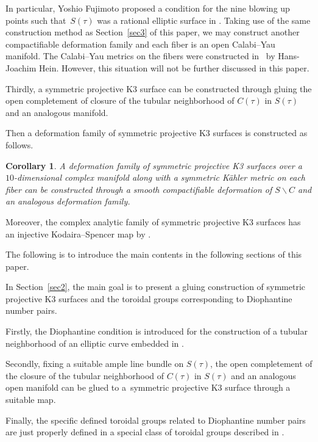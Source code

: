 \documentclass[pdftex]{sigma}
\numberwithin{equation}{section}
\newtheorem{Corollary}[Theorem]{Corollary}
\begin{document}
In particular, Yoshio Fujimoto proposed a condition for the nine blowing up points such that~$S(\tau)$ was a rational elliptic surface in \cite{Yoshio}. Taking use of the same construction method as Section~\ref{sec3} of this paper, we may construct another compactifiable deformation family and each fiber is an open Calabi--Yau manifold. The Calabi--Yau metrics on the fibers were constructed in~\cite{Hans} by Hans-Joachim Hein. However, this situation will not be further discussed in this paper.

Thirdly, a symmetric projective K3 surface can be constructed through gluing the open completement of closure of the tubular neighborhood of $C(\tau)$ in $S(\tau)$ and an analogous manifold.

Then a deformation family of symmetric projective K3 surfaces is constructed as follows.

\begin{Corollary} \label{Corollary1.2}
A deformation family of symmetric projective K3 surfaces over a $10$-dimensional complex manifold along with a symmetric K\"ahler metric on each fiber can be constructed through a smooth compactifiable deformation of $S \backslash C$ and an analogous deformation family.
\end{Corollary}

Moreover, the complex analytic family of symmetric projective K3 surfaces has an injective Kodaira--Spencer map by \cite[Theorem~1.1]{Takayuki-Takato1}.

The following is to introduce the main contents in the following sections of this paper.

In Section~\ref{sec2}, the main goal is to present a gluing construction of symmetric projective K3 surfaces and the toroidal groups corresponding to Diophantine number pairs.

Firstly, the Diophantine condition is introduced for the construction of a tubular neighborhood of an elliptic curve embedded in .

Secondly, fixing a suitable ample line bundle on $S(\tau)$, the open completement of the closure of the tubular neighborhood of $C(\tau)$ in $S(\tau)$ and an analogous open manifold can be glued to a~symmetric projective K3 surface through a suitable map.

Finally, the specific defined toroidal groups related to Diophantine number pairs are just properly defined in a special class of toroidal groups described in \cite[Theorem]{Christian}.
\end{document}
